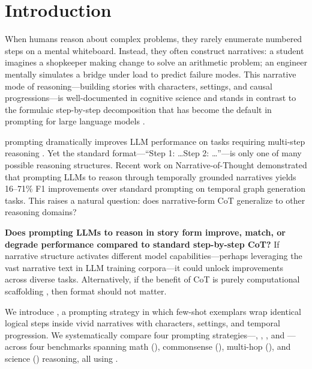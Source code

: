 \section{Introduction}
\label{sec:intro}

When humans reason about complex problems, they rarely enumerate numbered steps on a mental whiteboard. Instead, they often construct narratives: a student imagines a shopkeeper making change to solve an arithmetic problem; an engineer mentally simulates a bridge under load to predict failure modes. This narrative mode of reasoning---building stories with characters, settings, and causal progressions---is well-documented in cognitive science \citep{bruner1991narrative} and stands in contrast to the formulaic step-by-step decomposition that has become the default in \chainofthought prompting for large language models \citep{wei2022chain}.

 \chainofthought prompting dramatically improves LLM performance on tasks requiring multi-step reasoning \citep{wei2022chain, wang2023selfconsistency}. Yet the standard format---``Step 1: \ldots Step 2: \ldots''---is only one of many possible reasoning structures. Recent work on Narrative-of-Thought \citep{zhang2024narrative} demonstrated that prompting LLMs to reason through temporally grounded narratives yields 16--71\% F1 improvements over standard prompting on temporal graph generation tasks. This raises a natural question: does narrative-form CoT generalize to other reasoning domains?

 {\bf Does prompting LLMs to reason in story form improve, match, or degrade performance compared to standard step-by-step CoT?} If narrative structure activates different model capabilities---perhaps leveraging the vast narrative text in LLM training corpora---it could unlock improvements across diverse tasks. Alternatively, if the benefit of CoT is purely computational scaffolding \citep{schaeffer2023invalid}, then format should not matter.

 We introduce \storycot, a prompting strategy in which few-shot exemplars wrap identical logical steps inside vivid narratives with characters, settings, and temporal progression. We systematically compare four prompting strategies---\directprompt, \zeroshotcot, \fewshotcot, and \storycot---across four benchmarks spanning math (\gsm), commonsense (\csqa), multi-hop (\strategyqa), and science (\arc) reasoning, all using \gptfour.


